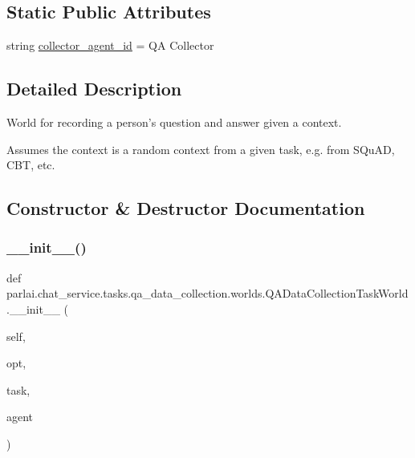 \subsection*{Static Public Attributes}
\begin{DoxyCompactItemize}
\item 
string \hyperlink{classparlai_1_1chat__service_1_1tasks_1_1qa__data__collection_1_1worlds_1_1QADataCollectionTaskWorld_a42da66fd3f9b8dc03d94f7788d0d807c}{collector\+\_\+agent\+\_\+id} = \textquotesingle{}QA Collector\textquotesingle{}
\end{DoxyCompactItemize}


\subsection{Detailed Description}
\begin{DoxyVerb}World for recording a person's question and answer given a context.

Assumes the context is a random context from a given task, e.g. from SQuAD, CBT,
etc.
\end{DoxyVerb}
 

\subsection{Constructor \& Destructor Documentation}
\mbox{\label{classparlai_1_1chat__service_1_1tasks_1_1qa__data__collection_1_1worlds_1_1QADataCollectionTaskWorld_ab84f1948bc80ae0de93567ea3e4488f2}} 
\subsubsection{\texorpdfstring{\+\_\+\+\_\+init\+\_\+\+\_\+()}{\_\_init\_\_()}}
{\footnotesize\ttfamily def parlai.\+chat\+\_\+service.\+tasks.\+qa\+\_\+data\+\_\+collection.\+worlds.\+Q\+A\+Data\+Collection\+Task\+World.\+\_\+\+\_\+init\+\_\+\+\_\+ (\begin{DoxyParamCaption}\item[{}]{self,  }\item[{}]{opt,  }\item[{}]{task,  }\item[{}]{agent }\end{DoxyParamCaption})}




